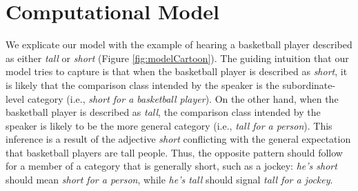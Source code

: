 \documentclass[doc]{apa6}
\begin{document}
\section{Computational Model}

We explicate our model with the example of hearing a basketball player described as either \emph{tall} or \emph{short} (Figure \ref{fig:modelCartoon}). 
The guiding intuition that our model tries to capture is that when the basketball player is described as \emph{short}, it is likely that the comparison class intended by the speaker is the subordinate-level category (i.e., \emph{short for a basketball player}). 
On the other hand, when the basketball player is described as \emph{tall}, the comparison class intended by the speaker is likely to be the more general category (i.e., \emph{tall for a person}).
This inference is a result of the adjective \emph{short} conflicting with the general expectation that basketball players are tall people.
Thus, the opposite pattern should follow for a member of a category that is generally short, such as a jockey: \emph{he's short} should mean \emph{short for a person}, while \emph{he's tall} should signal \emph{tall for a jockey}.




%
\end{document}
